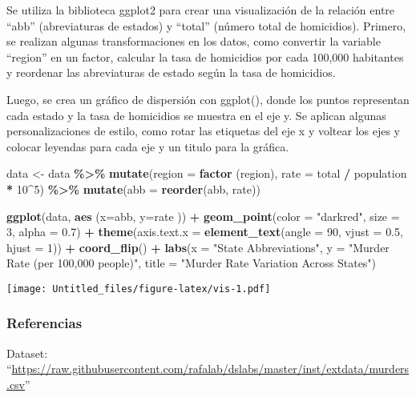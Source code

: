 \documentclass[
]{article}
\newenvironment{Shaded}{\begin{snugshade}}{\end{snugshade}}
\newcommand{\AttributeTok}[1]{\textcolor[rgb]{0.13,0.29,0.53}{#1}}
\newcommand{\DecValTok}[1]{\textcolor[rgb]{0.00,0.00,0.81}{#1}}
\newcommand{\FloatTok}[1]{\textcolor[rgb]{0.00,0.00,0.81}{#1}}
\newcommand{\FunctionTok}[1]{\textcolor[rgb]{0.13,0.29,0.53}{\textbf{#1}}}
\newcommand{\NormalTok}[1]{#1}
\newcommand{\OtherTok}[1]{\textcolor[rgb]{0.56,0.35,0.01}{#1}}
\newcommand{\SpecialCharTok}[1]{\textcolor[rgb]{0.81,0.36,0.00}{\textbf{#1}}}
\newcommand{\StringTok}[1]{\textcolor[rgb]{0.31,0.60,0.02}{#1}}
\begin{document}
Se utiliza la biblioteca ggplot2 para crear una visualización de la
relación entre ``abb'' (abreviaturas de estados) y ``total'' (número
total de homicidios). Primero, se realizan algunas transformaciones en
los datos, como convertir la variable ``region'' en un factor, calcular
la tasa de homicidios por cada 100,000 habitantes y reordenar las
abreviaturas de estado según la tasa de homicidios.

Luego, se crea un gráfico de dispersión con ggplot(), donde los puntos
representan cada estado y la tasa de homicidios se muestra en el eje y.
Se aplican algunas personalizaciones de estilo, como rotar las etiquetas
del eje x y voltear los ejes y colocar leyendas para cada eje y un
titulo para la gráfica.

\begin{Shaded}
\begin{Highlighting}[]
\NormalTok{data }\OtherTok{\textless{}{-}}\NormalTok{ data }\SpecialCharTok{\%\textgreater{}\%} \FunctionTok{mutate}\NormalTok{(}\AttributeTok{region =} \FunctionTok{factor}\NormalTok{ (region), }\AttributeTok{rate =}\NormalTok{ total }\SpecialCharTok{/}\NormalTok{ population }\SpecialCharTok{*} \DecValTok{10}\SpecialCharTok{\^{}}\DecValTok{5}\NormalTok{) }\SpecialCharTok{\%\textgreater{}\%} \FunctionTok{mutate}\NormalTok{(}\AttributeTok{abb =} \FunctionTok{reorder}\NormalTok{(abb, rate))}

\FunctionTok{ggplot}\NormalTok{(data, }\FunctionTok{aes}\NormalTok{ (}\AttributeTok{x=}\NormalTok{abb, }\AttributeTok{y=}\NormalTok{rate )) }\SpecialCharTok{+} \FunctionTok{geom\_point}\NormalTok{(}\AttributeTok{color =} \StringTok{"darkred"}\NormalTok{, }\AttributeTok{size =} \DecValTok{3}\NormalTok{, }\AttributeTok{alpha =} \FloatTok{0.7}\NormalTok{) }\SpecialCharTok{+}   
  \FunctionTok{theme}\NormalTok{(}\AttributeTok{axis.text.x =} \FunctionTok{element\_text}\NormalTok{(}\AttributeTok{angle =} \DecValTok{90}\NormalTok{, }\AttributeTok{vjust =} \FloatTok{0.5}\NormalTok{, }\AttributeTok{hjust =} \DecValTok{1}\NormalTok{)) }\SpecialCharTok{+} 
  \FunctionTok{coord\_flip}\NormalTok{() }\SpecialCharTok{+}
  \FunctionTok{labs}\NormalTok{(}\AttributeTok{x =} \StringTok{"State Abbreviations"}\NormalTok{, }
       \AttributeTok{y =} \StringTok{"Murder Rate (per 100,000 people)"}\NormalTok{,}
       \AttributeTok{title =} \StringTok{"Murder Rate Variation Across States"}\NormalTok{)}
\end{Highlighting}
\end{Shaded}

\texttt{[image: Untitled\_files/figure-latex/vis-1.pdf]}

\hypertarget{referencias}{%
\subsubsection{Referencias}\label{referencias}}

Dataset:
``\url{https://raw.githubusercontent.com/rafalab/dslabs/master/inst/extdata/murders.csv}''
\end{document}
